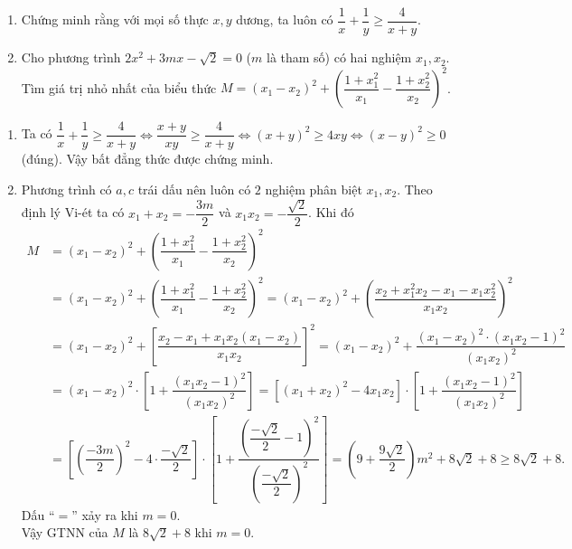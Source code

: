 \begin{ex}%
	\begin{enumerate}[1)]
		\item Chứng minh rằng với mọi số thực $x,y$ dương, ta luôn có $\dfrac{1}{x} + \dfrac{1}{y} \ge \dfrac{4}{x+y}$.
		\item Cho phương trình $2x^2 + 3mx - \sqrt{2} = 0$ ($m$ là tham số) có hai nghiệm $x_1, x_2$. Tìm giá trị nhỏ nhất của biểu thức $M = (x_1 - x_2)^2 + \left(\dfrac{1 + x_1^2}{x_1} - \dfrac{1 + x_2^2}{x_2}\right)^2$.
	\end{enumerate}
	\loigiai
	{
		\begin{enumerate}[1)]
			\item Ta có $\dfrac{1}{x}+\dfrac{1}{y}\ge \dfrac{4}{x+y}\Leftrightarrow \dfrac{x+y}{xy}\ge \dfrac{4}{x+y}\Leftrightarrow (x+y)^2\ge 4xy\Leftrightarrow (x-y)^2\ge 0$ (đúng). Vậy bất đẳng thức được chứng minh.
			\item Phương trình có $a,c$ trái dấu nên luôn có $2$ nghiệm phân biệt $x_1,x_2$. Theo định lý Vi-ét ta có $x_1+x_2 = -\dfrac{3m}{2}$ và $x_1 x_2 = -\dfrac{\sqrt{2}}{2}$. Khi đó
				\begin{align*}
					M &= (x_1 - x_2)^2 + \left(\dfrac{1 + x_1^2}{x_1} - \dfrac{1 + x_2^2}{x_2}\right)^2 \\
						&={\left(x_1-x_2\right)}^2+{\left(\dfrac{1+x_1^2}{x_1}-\dfrac{1+x_2^2}{x_2}\right)}^2={\left(x_1-x_2\right)}^2+{\left(\dfrac{x_2+x_1^2x_2-x_1-x_1x_2^2}{x_1x_2}\right)}^2 \\
						&={\left(x_1-x_2\right)}^2+{\left[\dfrac{x_2-x_1+x_1x_2\left(x_1-x_2\right)}{x_1x_2}\right]}^2={\left(x_1-x_2\right)}^2+\dfrac{{\left(x_1-x_2\right)}^2\cdot {\left(x_1x_2-1\right)}^2}{{\left(x_1x_2\right)}^2} \\
						&={\left(x_1-x_2\right)}^2\cdot \left[1+\dfrac{{\left(x_1x_2-1\right)}^2}{{\left(x_1x_2\right)}^2}\right]=\left[{\left(x_1+x_2\right)}^2-4x_1x_2\right]\cdot \left[1+\dfrac{{\left(x_1x_2-1\right)}^2}{{\left(x_1x_2\right)}^2}\right] \\
						&=\left[{\left(\dfrac{-3m}{2}\right)}^2-4\cdot \dfrac{-\sqrt{2}}{2}\right]\cdot \left[1+\dfrac{{\left(\dfrac{-\sqrt{2}}{2}-1\right)}^2}{{\left(\dfrac{-\sqrt{2}}{2}\right)}^2}\right]=\left(9+\dfrac{9\sqrt{2}}{2}\right)m^2+8\sqrt{2}+8\ge 8\sqrt{2}+8.
				\end{align*}
				Dấu ``$=$''  xảy ra khi $m = 0$. \\
				Vậy GTNN của $M$ là $8\sqrt{2}+8$ khi $m=0$.
		\end{enumerate}	
	}
\end{ex}

